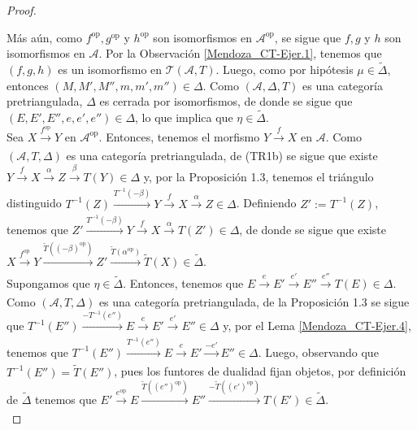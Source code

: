 \documentclass[tesis]{subfiles}
\begin{document}
\begin{proof}
\begin{center}
    \end{center}
    Más aún, como $f^\text{op},g^\text{op}$ y $h^\text{op}$ son isomorfismos en $\mathscr{A}^\text{op}$, se sigue que $f,g$ y $h$ son isomorfismos en $\mathscr{A}$. Por la Observación \ref{Mendoza_CT-Ejer.1}, tenemos que $(f,g,h)$ es un isomorfismo en $\mathscr{T}(\mathscr{A},T)$. Luego, como por hipótesis $\mu\in\tilde{\Delta}$, entonces $(M,M',M'',m,m',m'')\in\Delta$. Como $(\mathscr{A},\Delta,T)$ es una categoría pretriangulada, $\Delta$ es cerrada por isomorfismos, de donde se sigue que $(E,E',E'',e,e',e'')\in\Delta$, lo que implica que $\eta\in\tilde{\Delta}$. \\

    Sea $X\xrightarrow[]{f^\text{op}}Y$ en $\mathscr{A}^\text{op}$. Entonces, tenemos el morfismo $Y\xrightarrow[]{f}X$ en $\mathscr{A}$. Como $(\mathscr{A},T,\Delta)$ es una categoría pretriangulada, de (TR1b) se sigue que existe $Y\xrightarrow[]{f}X\xrightarrow[]{\alpha}Z\xrightarrow[]{\beta}T(Y)\in\Delta$ y, por la Proposición 1.3, tenemos el triángulo distinguido $T^{-1}(Z)\xrightarrow[]{T^{-1}(-\beta)} Y\xrightarrow[]{f} X\xrightarrow[]{\alpha} Z\in\Delta$. Definiendo $Z':=T^{-1}(Z)$, tenemos que $Z'\xrightarrow[]{T^{-1}(-\beta)}Y\xrightarrow[]{f}X\xrightarrow[]{\alpha}T(Z')\in\Delta$, de donde se sigue que existe $X\xrightarrow[]{f^\text{op}}Y\xrightarrow[]{\tilde{T}((-\beta)^\text{op})}Z'\xrightarrow[]{\tilde{T}(\alpha^\text{op})}\tilde{T}(X)\in\tilde{\Delta}$. \\

    Supongamos que $\eta\in\tilde{\Delta}$. Entonces, tenemos que $E\xrightarrow[]{e}E'\xrightarrow[]{e'}E''\xrightarrow[]{e''}T(E)\in\Delta$. Como $(\mathscr{A},T,\Delta)$ es una categoría pretriangulada, de la Proposición 1.3 se sigue que $T^{-1}(E'')\xrightarrow[]{-T^{-1}(e'')}E\xrightarrow[]{e}E'\xrightarrow[]{e'}E''\in\Delta$ y, por el Lema \ref{Mendoza_CT-Ejer.4}, tenemos que $T^{-1}(E'')\xrightarrow[]{T^{-1}(e'')}E\xrightarrow[]{e}E'\xrightarrow[]{-e'}E''\in\Delta$. Luego, observando que $T^{-1}(E'')=\tilde{T}(E'')$, pues los funtores de dualidad fijan objetos, por definición de $\tilde{\Delta}$ tenemos que $E'\xrightarrow[]{e^\text{op}}E\xrightarrow[]{\tilde{T}((e'')^\text{op})}E''\xrightarrow[]{-\tilde{T}((e')^\text{op})} T(E')\in\tilde{\Delta}$. \\


\end{proof}
\end{document}
